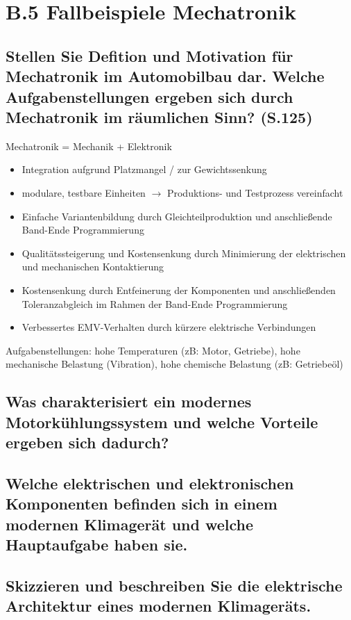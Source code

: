 \section*{B.5 Fallbeispiele Mechatronik}

\subsection{Stellen Sie Defition und Motivation f\"ur Mechatronik im Automobilbau dar. Welche Aufgabenstellungen ergeben sich durch Mechatronik im r\"aumlichen Sinn? (S.125)}
Mechatronik = Mechanik + Elektronik
\begin{itemize}
\item Integration aufgrund Platzmangel / zur Gewichtssenkung
\item modulare, testbare Einheiten $\rightarrow$ Produktions- und Testprozess vereinfacht
\item Einfache Variantenbildung durch Gleichteilproduktion und anschließende Band-Ende Programmierung
\item Qualitätssteigerung und Kostensenkung durch Minimierung der elektrischen und mechanischen Kontaktierung
\item Kostensenkung durch Entfeinerung der Komponenten und anschließenden Toleranzabgleich im Rahmen der 
Band-Ende Programmierung
\item Verbessertes EMV-Verhalten durch kürzere elektrische Verbindungen
\end{itemize}
Aufgabenstellungen: hohe Temperaturen (zB: Motor, Getriebe), hohe mechanische Belastung (Vibration), hohe 
chemische Belastung (zB: Getriebeöl)

\subsection{Was charakterisiert ein modernes Motork\"uhlungssystem und welche Vorteile ergeben sich dadurch?}

\subsection{Welche elektrischen und elektronischen Komponenten befinden sich in einem modernen Klimager\"at und welche Hauptaufgabe haben sie.}

\subsection{Skizzieren und beschreiben Sie die elektrische Architektur eines modernen Klimager\"ats.}
